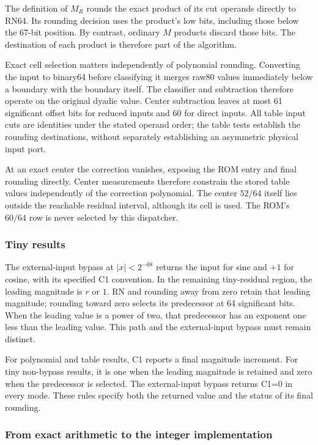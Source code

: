 \documentclass[11pt]{article}
\begin{document}
The definition of $M_R$ rounds the exact product of its cut operands directly
to RN64. Its rounding decision uses the product's low bits, including those
below the 67-bit position. By contrast, ordinary $M$ products discard those
bits. The destination of each product is therefore part of the algorithm.

Exact cell selection matters independently of polynomial rounding. Converting
the input to binary64 before classifying it merges raw80 values immediately
below a boundary with the boundary itself. The classifier and subtraction
therefore operate on the original dyadic value. Center subtraction leaves
at most 61 significant offset bits for reduced inputs and 60 for direct
inputs. All table input cuts are identities under the stated operand order;
the table tests establish the rounding destinations, without separately
establishing an asymmetric physical input port.

At an exact center the correction vanishes, exposing the ROM entry and final
rounding directly. Center measurements therefore constrain the stored table values
independently of the correction polynomial. The center $52/64$ itself lies
outside the reachable residual interval, although its cell is used. The ROM's $60/64$ row is never selected by this
dispatcher.

\subsubsection{Tiny results}

The external-input bypass at $|x|<2^{-68}$ returns the input for sine
and $+1$ for cosine, with its specified C1 convention. In the remaining
tiny-residual region, the leading magnitude is $r$ or $1$. RN and rounding
away from zero retain that leading magnitude; rounding toward zero selects
its predecessor at 64 significant bits. When the leading value is a power of two, that predecessor has an exponent
one less than the leading value. This path and
the external-input bypass must remain distinct.

For polynomial and table results, C1 reports a final magnitude increment.
For tiny non-bypass results, it is one when the leading magnitude is retained
and zero when the predecessor is selected. The external-input bypass returns
C1=0 in every mode. These rules specify both the returned value and the status of its final
rounding.

\subsubsection{From exact arithmetic to the integer implementation}
\end{document}
